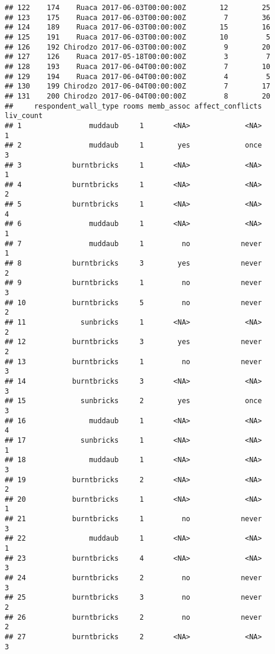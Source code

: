 \documentclass[
]{article}
\begin{document}
\begin{verbatim}
## 122    174    Ruaca 2017-06-03T00:00:00Z        12        25
## 123    175    Ruaca 2017-06-03T00:00:00Z         7        36
## 124    189    Ruaca 2017-06-03T00:00:00Z        15        16
## 125    191    Ruaca 2017-06-03T00:00:00Z        10         5
## 126    192 Chirodzo 2017-06-03T00:00:00Z         9        20
## 127    126    Ruaca 2017-05-18T00:00:00Z         3         7
## 128    193    Ruaca 2017-06-04T00:00:00Z         7        10
## 129    194    Ruaca 2017-06-04T00:00:00Z         4         5
## 130    199 Chirodzo 2017-06-04T00:00:00Z         7        17
## 131    200 Chirodzo 2017-06-04T00:00:00Z         8        20
##     respondent_wall_type rooms memb_assoc affect_conflicts liv_count
## 1                muddaub     1       <NA>             <NA>         1
## 2                muddaub     1        yes             once         3
## 3            burntbricks     1       <NA>             <NA>         1
## 4            burntbricks     1       <NA>             <NA>         2
## 5            burntbricks     1       <NA>             <NA>         4
## 6                muddaub     1       <NA>             <NA>         1
## 7                muddaub     1         no            never         1
## 8            burntbricks     3        yes            never         2
## 9            burntbricks     1         no            never         3
## 10           burntbricks     5         no            never         2
## 11             sunbricks     1       <NA>             <NA>         2
## 12           burntbricks     3        yes            never         2
## 13           burntbricks     1         no            never         3
## 14           burntbricks     3       <NA>             <NA>         3
## 15             sunbricks     2        yes             once         3
## 16               muddaub     1       <NA>             <NA>         4
## 17             sunbricks     1       <NA>             <NA>         1
## 18               muddaub     1       <NA>             <NA>         3
## 19           burntbricks     2       <NA>             <NA>         2
## 20           burntbricks     1       <NA>             <NA>         1
## 21           burntbricks     1         no            never         3
## 22               muddaub     1       <NA>             <NA>         1
## 23           burntbricks     4       <NA>             <NA>         3
## 24           burntbricks     2         no            never         3
## 25           burntbricks     3         no            never         2
## 26           burntbricks     2         no            never         2
## 27           burntbricks     2       <NA>             <NA>         3

\end{verbatim}
\end{document}
